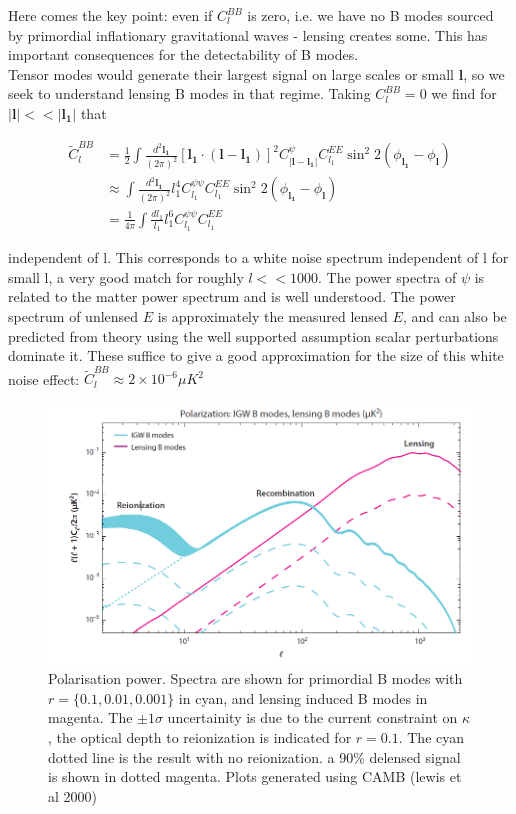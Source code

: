 \documentclass[a4paper,10pt]{article}
\renewcommand{\v}[1]{\mathbf{#1}}
\newcommand{\half}{\frac{1}{2}}
\newcommand{\finttwo}[1]{\int \frac{d^2 \v{#1}}{(2\pi)^2}}
\begin{document}
Here comes the key point: even if $C_{l}^{BB}$ is zero, i.e. we have no B modes sourced by primordial inflationary gravitational waves - lensing creates some. This has important consequences for the detectability of B modes.\\

Tensor modes would generate their largest signal on large scales or small $\v{l}$, so we seek to understand lensing B modes in that regime. Taking $C_l^{BB}=0$ we find for $|\v{l}| << |\v{l_1}|$ that 

\begin{equation}\begin{split}
\tilde{C}_l^{BB} &= \half \finttwo{l_1}[ \v{l_1}\cdot(\v{l}-\v{l_1})]^2 C^\psi_{|\v{l}-\v{l_1}|}C_{l_1}^{EE}\sin^2{2(\phi_\v{l_1}-\phi_\v{l})}\\
&\approx \finttwo{l_1} l_1^4C^{\psi\psi}_{l_1}C^{EE}_{l_1}\sin^2{2(\phi_\v{l_1}-\phi_\v{l})}\\
&=\frac{1}{4\pi}\int \frac{dl_1}{l_1}l_1^6C^{\psi\psi}_{l_1}C^{EE}_{l_1}
\end{split}\end{equation}

independent of l. This corresponds to a white noise spectrum independent of l for small l, a very good match for roughly $l<<1000$. The power spectra of $\psi$ is related to the matter power spectrum and is well understood. The power spectrum of unlensed $E$ is approximately the measured lensed $E$, and can also be predicted from theory using the well supported assumption scalar perturbations dominate it. These suffice to give a good approximation for the size of this white noise effect: $\tilde{C}_l^{BB} \approx 2\times10^{-6}\mu K^2$\\

\begin{figure}[h]
  \includegraphics[width=\linewidth]{lensingfucksus.png}
  \caption{Polarisation power. Spectra are shown for primordial B modes with $r=\{0.1,0.01,0.001\}$ in cyan, and lensing induced B modes in magenta. The $\pm1\sigma$ uncertainity is due to the current constraint on $\kappa$, the optical depth to reionization is indicated for $r=0.1$. The cyan dotted line is the result with no reionization. a 90\% delensed signal is shown in dotted magenta. Plots generated using CAMB (lewis et al 2000)}
  \label{lensingisfucked}
\end{figure}
\end{document}
